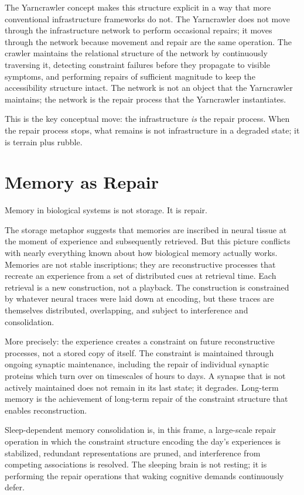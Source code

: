 \documentclass[11pt, a4paper]{article}
\theoremstyle{definition}
\theoremstyle{remark}
\begin{document}
The Yarncrawler concept makes this structure explicit in a way that more
conventional infrastructure frameworks do not. The Yarncrawler does not move
through the infrastructure network to perform occasional repairs; it moves
through the network because movement and repair are the same operation. The
crawler maintains the relational structure of the network by continuously
traversing it, detecting constraint failures before they propagate to visible
symptoms, and performing repairs of sufficient magnitude to keep the
accessibility structure intact. The network is not an object that the
Yarncrawler maintains; the network is the repair process that the Yarncrawler
instantiates.

This is the key conceptual move: the infrastructure \textit{is} the repair
process. When the repair process stops, what remains is not infrastructure in a
degraded state; it is terrain plus rubble.

\section{Memory as Repair}

Memory in biological systems is not storage. It is repair.

The storage metaphor suggests that memories are inscribed in neural tissue
at the moment of experience and subsequently retrieved. But this picture
conflicts with nearly everything known about how biological memory actually
works. Memories are not stable inscriptions; they are reconstructive processes
that recreate an experience from a set of distributed cues at retrieval time.
Each retrieval is a new construction, not a playback. The construction is
constrained by whatever neural traces were laid down at encoding, but these
traces are themselves distributed, overlapping, and subject to interference and
consolidation.

More precisely: the experience creates a constraint on future reconstructive
processes, not a stored copy of itself. The constraint is maintained through
ongoing synaptic maintenance, including the repair of individual synaptic
proteins which turn over on timescales of hours to days. A synapse that is not
actively maintained does not remain in its last state; it degrades. Long-term
memory is the achievement of long-term repair of the constraint structure that
enables reconstruction.

Sleep-dependent memory consolidation is, in this frame, a large-scale repair
operation in which the constraint structure encoding the day's experiences is
stabilized, redundant representations are pruned, and interference from
competing associations is resolved. The sleeping brain is not resting; it is
performing the repair operations that waking cognitive demands continuously
defer.
\end{document}
